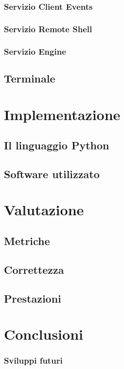 \subsubsection{Servizio Client Events}

\subsubsection{Servizio Remote Shell}

\subsubsection{Servizio Engine}

\subsection{Terminale}

\section{Implementazione}

\subsection{Il linguaggio Python}

\subsection{Software utilizzato}


\section{Valutazione}

\subsection{Metriche}

\subsection{Correttezza}

\subsection{Prestazioni}


\section{Conclusioni}

\subsubsection{Sviluppi futuri}
